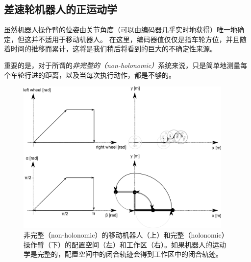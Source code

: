 \subsection{差速轮机器人的正运动学}
\label{sec:fwkmobile}


虽然机器人操作臂的位姿由关节角度（可以由编码器几乎实时地获得）唯一地确定，但这并不适用于移动机器人。 在这里，编码器值仅仅是指车轮方位，并且随着时间的推移而累计，这将是我们稍后将看到的巨大的不确定性来源。


重要的是，对于所谓的\emph{非完整的（non-holonomic）}系统来说，只是简单地测量每个车轮行进的距离，以及当每次执行动作，都是不够的。

\begin{figure}[htb!]
	\centering
		\includegraphics[width=0.95\textwidth]{figs/holonomy.png}
	\caption{非完整（non-holonomic）的移动机器人（上）和完整（holonomic）操作臂（下）的配置空间（左）和工作区（右）。如果机器人的运动学是完整的，配置空间中的闭合轨迹会得到工作区中的闭合轨迹。}
	\label{fig:holonomy}
\end{figure}

